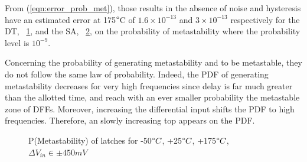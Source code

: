 From (\ref{eqn:error_prob_met}), those results in the absence of noise and hysteresis have an estimated error at 175\(\degree \)C of $1.6\times10^{-13}$ and $3\times10^{-13}$ respectively for the DT, \figurename~\ref{fig:DTL_prob_met_temp}, and the SA, \figurename~\ref{fig:SA_prob_met_temp}, on the probability of metastability where the probability level is $10^{-9}$.

Concerning the probability of generating metastability and to be metastable, they do not follow the same law of probability. Indeed, the PDF of generating metastability decreases for very high frequencies since delay is far much greater than the allotted time, and reach with an ever smaller probability the metastable zone of DFFs. Moreover, increasing the differential input shifts the PDF to high frequencies. Therefore, an slowly increasing top appears on the PDF\@.

\begin{figure}[htp]
	\centering
	\hspace{0.1cm}
	\begin{subfigure}[b]{0.48\textwidth}
		
		\label{fig:DTL_prob_met_temp}
	\end{subfigure}
	\hspace{0.1cm}
	\begin{subfigure}[b]{0.48\textwidth}
		
		\label{fig:SA_prob_met_temp}
	\end{subfigure}
	\caption{P(Metastability) of latches for -50$\degree C$, +25$\degree C$, +175$\degree C$, $\Delta V_{in} \in \pm 450 mV$}
	\label{fig:prob_met_temp}
\end{figure}


%		
%		

